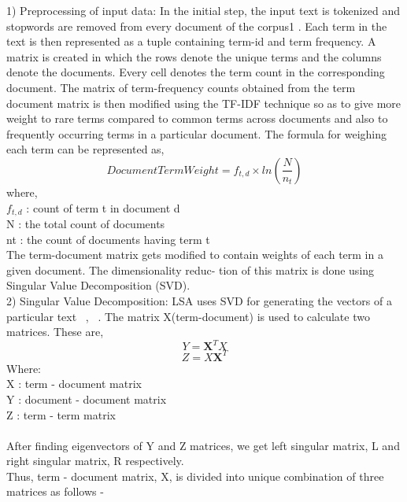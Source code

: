 \documentclass[12pt]{article}
\begin{document}
\begin{multicols}{2}
1) Preprocessing of input data: In the initial step, the
input text is tokenized and stopwords are removed from
every document of the corpus1 . Each term in the text is then
represented as a tuple containing term-id and term frequency.
A matrix is created in which the rows denote the unique terms
and the columns denote the documents. Every cell denotes
the term count in the corresponding document. The matrix
of term-frequency counts obtained from the term document
matrix is then modified using the TF-IDF technique so as to
give more weight to rare terms compared to common terms
across documents and also to frequently occurring terms in a
particular document. The formula for weighing each term can
be represented as,\\
\begin{equation}
DocumentTermWeight = f_{t,d} \times ln(\frac{N}{n_{t}})
\end{equation}
where,\\
$f_{t,d}$ : count of term t in document d\\
N : the total count of documents\\
nt : the count of documents having term t\\
The term-document matrix gets modified to contain weights
of each term in a given document. The dimensionality reduc-
tion of this matrix is done using Singular Value Decomposition
(SVD).\\
2) Singular Value Decomposition: LSA uses SVD for generating the vectors of a particular text ~\cite{12}, ~\cite{13}. The matrix X(term-document) is used to calculate two matrices. These are,\\
\begin{equation}
Y = \mathbf{X}^T X
\end{equation}
\begin{equation}
Z = X \mathbf{X}^T
\end{equation}
Where:\\
X : term - document matrix\\
Y : document - document matrix\\
Z : term - term matrix\\\\
After finding eigenvectors of Y and Z matrices, we get left singular matrix, L and right singular matrix, R respectively.\\
Thus, term - document matrix, X, is divided into unique combination of three matrices as follows -\\

\end{multicols}
\end{document}
